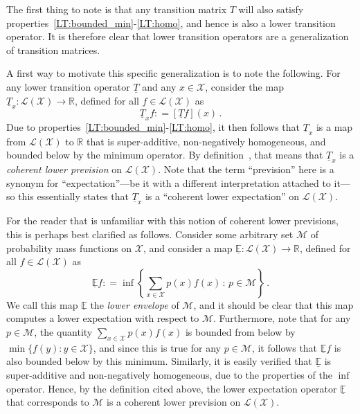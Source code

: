 \documentclass[10pt,a4paper]{paper}
\theoremstyle{definition}
\newcommand{\reals}{\mathbb{R}}
\newcommand{\states}{\mathcal{X}}
\newcommand{\lt}{\underline{T}}
\newcommand{\gambles}{\mathcal{L}}
\newcommand{\gamblesX}{\gambles(\states)}
\newcommand{\coloneqq}{:\!=}
\begin{document}
The first thing to note is that any transition matrix $T$ will also satisfy properties~\ref{LT:bounded_min}-\ref{LT:homo}, and hence is also a lower transition operator. It is therefore clear that lower transition operators are a generalization of transition matrices.

A first way to motivate this specific generalization is to note the following. For any lower transition operator $\lt$ and any $x\in\states$, consider the map $\lt_x:\gamblesX\to\reals$, defined for all $f\in\gamblesX$ as
\begin{equation}\label{eq:lowerprevisionfromlt}
\lt_xf \coloneqq \left[\lt f\right](x)\,.
\end{equation}
Due to properties~\ref{LT:bounded_min}-\ref{LT:homo}, it then follows that $\lt_x$ is a map from $\gamblesX$ to $\reals$ that is super-additive, non-negatively homogeneous, and bounded below by the minimum operator. By definition~\cite[Definition~2.3.3]{Walley:1991vk}, that means that $\lt_x$ is a \emph{coherent lower prevision} on $\gamblesX$. Note that the term ``prevision'' here is a synonym for ``expectation''---be it with a different interpretation attached to it---so this essentially states that $\lt_x$ is a ``coherent lower expectation'' on $\gamblesX$.

For the reader that is unfamiliar with this notion of coherent lower previsions, this is perhaps best clarified as follows. Consider some arbitrary set $\mathcal{M}$ of probability mass functions on $\states$, and consider a map $\underline{\mathbb{E}}:\gamblesX\to\reals$, defined for all $f\in\gamblesX$ as
\begin{equation*}
\underline{\mathbb{E}}f \coloneqq \inf\left\{\sum_{x\in\states} p(x)f(x)\,:\,p\in\mathcal{M}\right\}\,.
\end{equation*}
We call this map $\underline{\mathbb{E}}$ the \emph{lower envelope} of $\mathcal{M}$, and it should be clear that this map computes a lower expectation with respect to $\mathcal{M}$. Furthermore, note that for any $p\in\mathcal{M}$, the quantity $\sum_{x\in\states}p(x)f(x)$ is bounded from below by $\min\{f(y):y\in\states\}$, and since this is true for any $p\in\mathcal{M}$, it follows that $\underline{\mathbb{E}}f$ is also bounded below by this minimum. Similarly, it is easily verified that $\underline{\mathbb{E}}$ is super-additive and non-negatively homogeneous, due to the properties of the $\inf$ operator. Hence, by the definition cited above, the lower expectation operator $\underline{\mathbb{E}}$ that corresponds to $\mathcal{M}$ is a coherent lower prevision on $\gamblesX$. 
\end{document}
